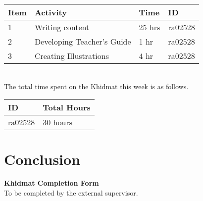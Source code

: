 \documentclass{article}
\begin{document}
\begin{tabular}{|l|l|l|l|}
  \hline
  Item 	& Activity & Time & ID \\\hline\hline
  1	& Writing content & 25 hrs & ra02528 \\\hline
  2	& Developing Teacher's Guide & 1 hr & ra02528 \\\hline
  3	& Creating Illustrations & 4 hr & ra02528 \\\hline
\end{tabular}\\

The total time spent on the Khidmat this week is as follows.

\begin{tabular}{|l|l|}
  \hline
  ID & Total Hours\\\hline\hline
  ra02528 & 30 hours\\\hline
\end{tabular}

\newpage
\section*{Conclusion}


\newpage
\thispagestyle{empty}

\begin{center}
  {\Large\bf Khidmat Completion Form}\\[5pt]
  \small To be completed by the external supervisor.  
\end{center}
\bigskip

\vfill
\end{document}
